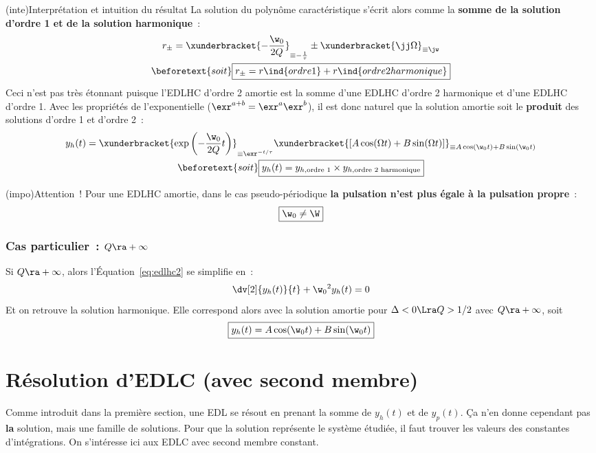 \documentclass[a4paper, 11pt, garamond]{book}
\begin{document}
\begin{tcn}[breakable](inte){Interprétation et intuition du résultat}
	La solution du polynôme caractéristique s'écrit alors comme la \textbf{somme
		de la solution d'ordre 1 et de la solution harmonique}~:
	\begin{gather*}
		r_{\pm} =
		\xunderbracket{-\frac{\w_0}{2Q}}_{\equiv -\frac{1}{\tau}}
		\pm
		\xunderbracket{\jj \Omega}_{\equiv \jw}
		\\
		\beforetext{soit}
		\boxed{r_{\pm} = r\ind{ordre 1} + r\ind{ordre 2 harmonique}}
	\end{gather*}
	Ceci n'est pas très étonnant puisque l'EDLHC d'ordre 2 amortie est la somme
	d'une EDLHC d'ordre 2 harmonique et d'une EDLHC d'ordre 1.
	\tcblower
	Avec les propriétés de l'exponentielle ($\exr^{a+b} = \exr^{a}\exr^{b}$), il
	est donc naturel que la solution amortie soit le \textbf{produit} des
	solutions d'ordre 1 et d'ordre 2~:
	\begin{gather*}
		y_h(t) =
		\xunderbracket{\exp\left( -\frac{\w_0}{2Q}t \right)}_{\equiv
			\exr^{-t/\tau}}
		\xunderbracket{%
			\left[A\cos(\Omega t) + B\sin(\Omega t)\right]%
		}_{\equiv A\cos(\w_0t) + B\sin(\w_0t)}
		\\
		\beforetext{soit}
		\boxed{%
			y_h(t) = y_{h, \text{ordre 1}} \times y_{h, \text{ordre 2 harmonique}}
		}
	\end{gather*}
\end{tcn}

\begin{tcn}(impo){Attention~!}
	Pour une EDLHC amortie, dans le cas pseudo-périodique \textbf{la pulsation
		n'est plus égale à la pulsation propre}~:
	\[
		\boxed{\w_0 \neq \W}
	\]
\end{tcn}

\subsubsection{Cas particulier~: $Q \ra +\infty$}
Si $Q \ra +\infty$, alors l'Équation~\eqref{eq:edlhc2} se simplifie en~:
\[
	\dv[2]{y_h(t)}{t} + \w_0{}^{2}y_h(t) = 0
\]
Et on retrouve la solution harmonique. Elle correspond alors avec la solution
amortie pour $\Delta < 0 \Lra Q>1/2$ avec $Q \ra +\infty$, soit
\[
	\boxed{y_h(t) = A \cos(\w_0t) + B\sin(\w_0t)}
\]

\section{Résolution d'EDLC (avec second membre)}
Comme introduit dans la première section, une EDL se résout en prenant la somme
de $y_h(t)$ et de $y_p(t)$. Ça n'en donne cependant pas \textbf{la} solution,
mais une famille de solutions. Pour que la solution représente le système
étudiée, il faut trouver les valeurs des constantes d'intégrations. On
s'intéresse ici aux EDLC avec second membre constant.
\end{document}
